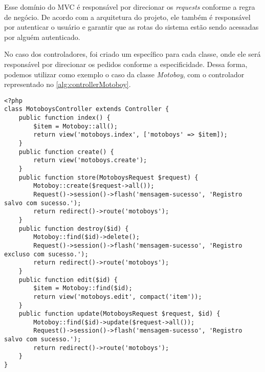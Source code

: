 Esse domínio do MVC é responsável por direcionar os \textit{requests} conforme a regra de negócio. De acordo com a arquitetura do projeto, ele também é responsável por autenticar o usuário e garantir que as rotas do sistema estão sendo acessadas por alguém autenticado. 

No caso dos controladores, foi criado um específico para cada classe, onde ele será responsável por direcionar os pedidos conforme a especificidade. Dessa forma, podemos utilizar como exemplo o caso da classe \textit{Motoboy}, com o controlador representado no \autoref{alg:controllerMotoboy}.

\begin{lstlisting}[caption={Delivery Routes - Exemplo de um Controller: Motoboy}, style=htmlcssjs, label=alg:controllerMotoboy]
<?php
class MotoboysController extends Controller {
    public function index() {
        $item = Motoboy::all();
        return view('motoboys.index', ['motoboys' => $item]);
    }
    public function create() {
        return view('motoboys.create');
    }
    public function store(MotoboysRequest $request) {
        Motoboy::create($request->all());
        Request()->session()->flash('mensagem-sucesso', 'Registro salvo com sucesso.');
        return redirect()->route('motoboys');
    }
    public function destroy($id) {
        Motoboy::find($id)->delete();
        Request()->session()->flash('mensagem-sucesso', 'Registro excluso com sucesso.');
        return redirect()->route('motoboys');
    }
    public function edit($id) {
        $item = Motoboy::find($id);
        return view('motoboys.edit', compact('item'));
    }
    public function update(MotoboysRequest $request, $id) {
        Motoboy::find($id)->update($request->all());
        Request()->session()->flash('mensagem-sucesso', 'Registro salvo com sucesso.');
        return redirect()->route('motoboys');
    }
}
\end{lstlisting}

